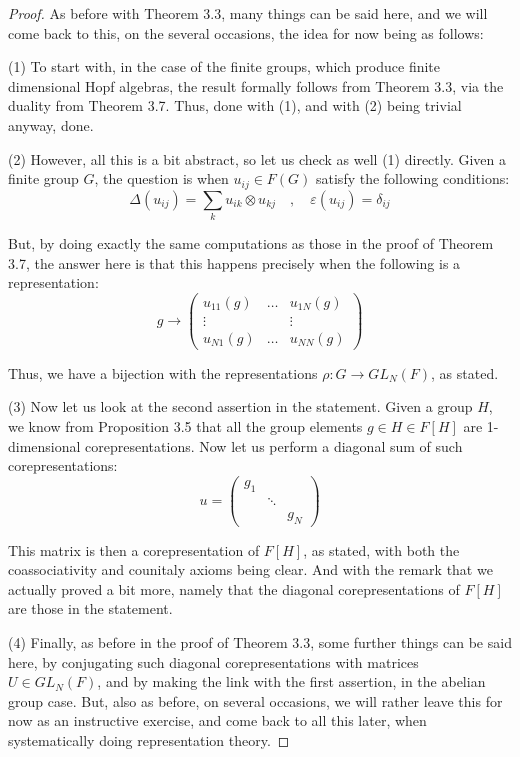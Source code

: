 \documentclass[12pt]{amsbook}
\begin{document}
\begin{proof}
As before with Theorem 3.3, many things can be said here, and we will come back to this, on the several occasions, the idea for now being as follows:

\medskip

(1) To start with, in the case of the finite groups, which produce finite dimensional Hopf algebras, the result formally follows from Theorem 3.3, via the duality from Theorem 3.7. Thus, done with (1), and with (2) being trivial anyway, done.

\medskip

(2) However, all this is a bit abstract, so let us check as well (1) directly. Given a finite group $G$, the question is when $u_{ij}\in F(G)$ satisfy the following conditions:
$$\Delta(u_{ij})=\sum_ku_{ik}\otimes u_{kj}\quad,\quad\varepsilon(u_{ij})=\delta_{ij}$$

But, by doing exactly the same computations as those in the proof of Theorem 3.7, the answer here is that this happens precisely when the following is a representation:
$$g\to\begin{pmatrix}
u_{11}(g)&\ldots&u_{1N}(g)\\
\vdots&&\vdots\\
u_{N1}(g)&\ldots&u_{NN}(g)
\end{pmatrix}$$

Thus, we have a bijection with the representations $\rho:G\to GL_N(F)$, as stated.

\medskip

(3) Now let us look at the second assertion in the statement. Given a group $H$, we know from Proposition 3.5 that all the group elements $g\in H\in F[H]$ are 1-dimensional corepresentations. Now let us perform a diagonal sum of such corepresentations:
$$u=\begin{pmatrix}
g_1\\
&\ddots\\
&&g_N
\end{pmatrix}$$

This matrix is then a corepresentation of $F[H]$, as stated, with both the coassociativity and counitaly axioms being clear. And with the remark that we actually proved a bit more, namely that the diagonal corepresentations of $F[H]$ are those in the statement. 

\medskip

(4) Finally, as before in the proof of Theorem 3.3, some further things can be said here, by conjugating such diagonal corepresentations with matrices $U\in GL_N(F)$, and by making the link with the first assertion, in the abelian group case. But, also as before, on several occasions, we will rather leave this for now as an instructive exercise, and come back to all this later, when systematically doing representation theory.
\end{proof}
\end{document}
